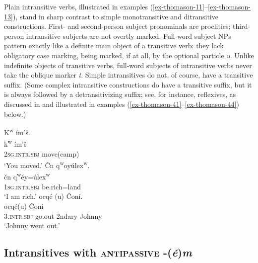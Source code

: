 \documentclass[output=paper,colorlinks,citecolor=brown]{langscibook}
\begin{document}
Plain intransitive verbs, illustrated in examples (\ref{ex-thomason-11}--\ref{ex-thomason-13}), stand in sharp
contrast to simple monotransitive and ditransitive constructions.
First- and second-per\-son subject pronominals are proclitics;
third-person intransitive subjects are not overtly marked.  Full-word
subject NPs pattern exactly like a definite main object of a
transitive verb: they lack obligatory case marking, being marked, if at
all, by the optional particle \emph{{\textltilde}u}.  Unlike indefinite
objects of transitive verbs, full-word subjects of intransitive verbs
never take the oblique marker \emph{t}.  Simple intransitives do not,
of course, have a transitive suffix.  (Some complex intransitive
constructions do have a transitive suffix, but it is always followed
by a detransitivizing suffix; see, for instance, reflexives, as
discussed in  and illustrated in examples 
(\ref{ex-thomason-41}--\ref{ex-thomason-44}) below.)\largerpage[-1]

\ea
\label{ex-thomason-11}
K\textsuperscript w \textglotstop\'im'\v{s}.  \\
\gll k\textsuperscript w \textglotstop\'im'\v{s}\\
\textsc{2sg}.\textsc{intr.sbj} move(camp)\\  
\glt `You moved.'
\ex 
\label{ex-thomason-12}
\v{C}n {q\textsuperscript w}oy\'ulex\textsuperscript w.  \\
\gll \v{c}n q\textsuperscript w\'ey=\'ulex\textsuperscript w\\
\textsc{1sg}.\textsc{intr.sbj} be.rich=land\\  
\glt `I am rich.'
\pagebreak
\ex 
\label{ex-thomason-13}
{\textglotstop}ocq\'e{\textglotstop} ({\textltilde}u)  \v{C}on\'i. \\
  {\textglotstop}ocq\'e\textglotstop ({\textltilde}u) \v{C}on\'i\\
3.\textsc{intr.sbj}  go.out 2ndary Johnny\\
 \glt `Johnny went out.'
 \z


\subsection{Intransitives with \textsc{antipassive} -(\emph{\'e})\emph{m}}  %
\label{thomason_section_2.4}
\end{document}
